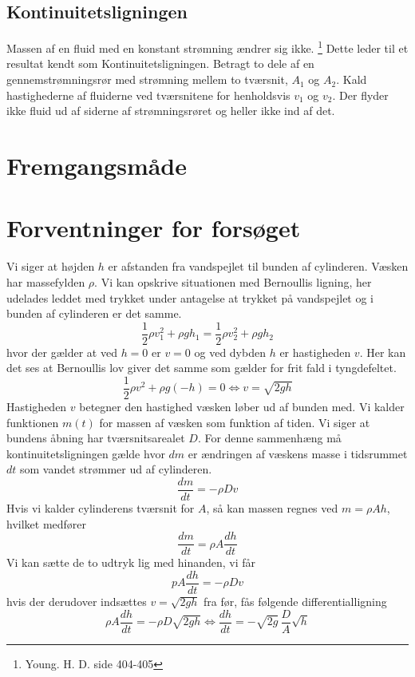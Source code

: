 \documentclass[a4paper, 11pt]{article}
\begin{document}
\subsection{Kontinuitetsligningen}
Massen af en fluid med en konstant strømning ændrer sig ikke. \footnote{Young. H. D. side 404-405}
Dette leder til et resultat kendt som Kontinuitetsligningen. Betragt to dele af en gennemstrømningsrør med strømning mellem to tværsnit, \(A_1\) og \(A_2\). Kald hastighederne af fluiderne ved tværsnitene for henholdsvis \(v_1\) og \(v_2\).
Der flyder ikke fluid ud af siderne af strømningsrøret og heller ikke ind af det. 
\section{Fremgangsmåde}

\section{Forventninger for forsøget}
Vi siger at højden \(h\) er afstanden fra vandspejlet til bunden af cylinderen. Væsken har massefylden \(\rho\). Vi kan opskrive situationen med Bernoullis ligning, her udelades leddet med trykket under antagelse at trykket på vandspejlet og i bunden af cylinderen er det samme.
\begin{equation}
    \frac{1}{2}\rho v_1^2+\rho g h_1 = \frac{1}{2}\rho v_2^2+\rho g h_2
\end{equation}
hvor der gælder at ved \(h=0\) er \(v=0\) og ved dybden \(h\) er hastigheden \(v\).
Her kan det ses at Bernoullis lov giver det samme som gælder for frit fald i tyngdefeltet.
\begin{equation}
    \frac{1}{2}\rho v^2+\rho g (-h)=0 \Leftrightarrow v=\sqrt{2gh}
\end{equation}
Hastigheden \(v\) betegner den hastighed væsken løber ud af bunden med. 
Vi kalder funktionen \(m(t)\) for massen af væsken som funktion af tiden. Vi siger at bundens åbning har tværsnitsarealet \(D\).
For denne sammenhæng må kontinuitetsligningen gælde hvor \(dm\) er ændringen af væskens masse i tidsrummet \(dt\) som vandet strømmer ud af cylinderen.
\[\frac{dm}{dt}=-\rho Dv\]
Hvis vi kalder cylinderens tværsnit for \(A\), så kan massen regnes ved \(m=\rho A h\), hvilket medfører
\[\frac{dm}{dt}= \rho A \frac{dh}{dt}\]
Vi kan sætte de to udtryk lig med hinanden, vi får
\[pA \frac{dh}{dt}=-\rho Dv\]
hvis der derudover indsættes \(v=\sqrt{2gh}\) fra før, fås følgende differentialligning
\begin{equation}
    \rho A \frac{dh}{dt} = -\rho D \sqrt{2gh} \Leftrightarrow \frac{dh}{dt} = -\sqrt{2g}\, \frac{D}{A}\sqrt{h} 
\end{equation}
\end{document}
